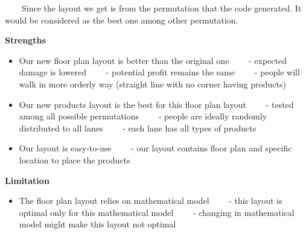 \ \ \ \ Since the layout we get is from the permutation that the code generated. It would be considered as the best one among other permutation. 
\newline

\textbf{Strengths}
\begin{itemize}
    \item Our new floor plan layout is better than the original one
        \newline
        \ \ \ \ - expected damage is lowered
        \newline
        \ \ \ \ - potential profit remains the same
        \newline
        \ \ \ \ - people will walk in more orderly way (straight line with no corner having products)
    \item Our new products layout is the best for this floor plan layout
        \newline
        \ \ \ \ - tested among all possible permutations
        \newline
        \ \ \ \ - people are ideally randomly distributed to all lanes
        \newline
        \ \ \ \ - each lane has all types of products
    \item Our layout is easy-to-use
        \newline
        \ \ \ \ - our layout contains floor plan and specific location to place the products
\end{itemize}

\textbf{Limitation}
\begin{itemize}
    \item The floor plan layout relies on mathematical model
        \newline
        \ \ \ \ - this layout is optimal only for this mathematical model
        \newline
        \ \ \ \ - changing in mathematical model might make this layout not optimal
\end{itemize}
